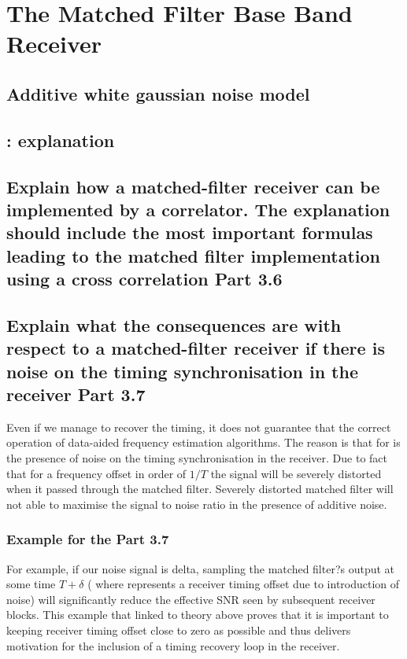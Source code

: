 \section{The Matched Filter Base Band Receiver}



\subsection{Additive white gaussian noise model}



\subsection{: explanation}


\subsection{ Explain how a matched-filter receiver can be implemented by a correlator. The explanation should include the most important formulas leading to the matched filter implementation using a cross correlation Part 3.6}


\subsection{ Explain what the consequences are with respect to a matched-filter receiver if there is noise on the timing synchronisation in the receiver Part 3.7}
 
Even if we manage to recover the timing, it does not guarantee that the correct operation of data-aided frequency estimation algorithms. The reason is that for is the presence of noise on the timing synchronisation in the receiver. Due to fact that for a frequency offset in order of $1/T$ the signal will be severely distorted when it passed through the matched filter. Severely distorted matched filter will not able to maximise the signal to noise ratio in the presence of additive noise.

\subsubsection{Example for the Part 3.7}

For example, if our noise signal is delta, sampling the matched filter?s output at some time $T+\delta$ ( where  represents a receiver timing offset due to introduction of noise) will significantly reduce the effective SNR seen by subsequent receiver blocks. This example that linked to theory above proves that it is important to keeping receiver timing offset close to zero as possible and thus delivers motivation for the inclusion of a timing recovery loop in the receiver.


